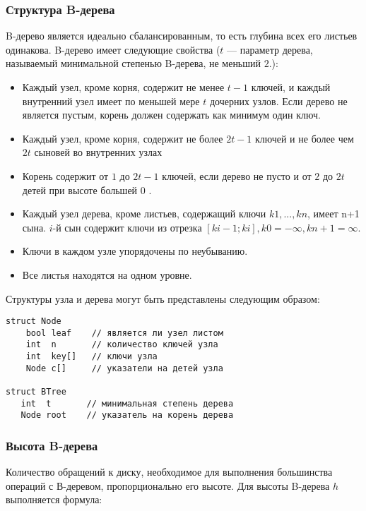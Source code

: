 \documentclass[14pt, russian]{scrartcl}
\begin{document}
\subsubsection{Структура B-дерева}

B-дерево является идеально сбалансированным, то есть глубина всех его листьев одинакова. B-дерево имеет следующие свойства ($t$ — параметр дерева, называемый минимальной степенью B-дерева, не меньший $2$.):

\begin{itemize}
    \item Каждый узел, кроме корня, содержит не менее $t - 1$ ключей, и каждый внутренний узел имеет по меньшей мере $t$ дочерних узлов. Если дерево не является пустым, корень должен содержать как минимум один ключ.
    \item Каждый узел, кроме корня, содержит не более $2t - 1$ ключей и не более чем $2t$ сыновей во внутренних узлах
    \item Корень содержит от $1$ до $2t - 1$ ключей, если дерево не пусто и от $2$ до $2t$ детей при высоте большей 0 .
    \item Каждый узел дерева, кроме листьев, содержащий ключи $k1, ..., kn$, имеет n+1 сына. $i$-й сын содержит ключи из отрезка $[ki - 1; ki], k0 = -\infty, kn + 1 = \infty$.
    \item Ключи в каждом узле упорядочены по неубыванию.
    \item Все листья находятся на одном уровне.
\end{itemize}

Структуры узла и дерева могут быть представлены следующим образом:
\begin{verbatim}
struct Node
    bool leaf    // является ли узел листом
    int  n       // количество ключей узла
    int  key[]   // ключи узла
    Node c[]     // указатели на детей узла

struct BTree
   int  t       // минимальная степень дерева
   Node root    // указатель на корень дерева
\end{verbatim}

\subsubsection{Высота B-дерева}
Количество обращений к диску, необходимое для выполнения большинства операций с В-деревом, пропорционально его высоте. Для высоты B-дерева $h$ выполняется формула:
\end{document}
